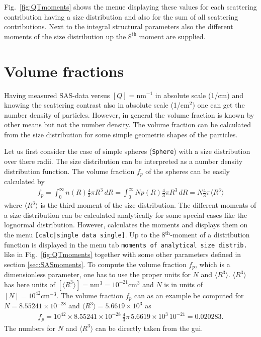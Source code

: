 Fig.\ \ref{fig:QTmoments} shows the \SASfit menue displaying these
values for each scattering contribution having a size distribution
and also for the sum of all scattering contributions. Next to the
integral structural parameters also the different moments of the
size distribution up the $8^\textrm{th}$ moment are supplied.

\section{Volume fractions}
\label{sec:volumefraction}

Having measured SAS-data versus $[Q]=\mathrm{nm}^{-1}$ in absolute scale
(1/cm) and knowing the scattering contrast also in absolute scale
(1/cm$^2$) one can get the number density of particles. However, in
general the volume fraction is known by other means but not the
number density. The volume fraction can be calculated from the size
distribution for some simple geometric shapes of the particles.


Let us first consider the case of simple spheres (\texttt{Sphere})
with a size distribution over there radii. The size distribution can
be interpreted as a number density distribution function. The volume
fraction $f_p$ of the spheres can be easily calculated by
\begin{align}
f_p = \int_0^\infty n(R) \frac{4}{3}\pi R^3 \, dR
    = \int_0^\infty N p(R) \frac{4}{3}\pi R^3 \, dR
    = N \frac{4}{3}\pi \langle R^3 \rangle
\label{eq:fpMomentSphere}
\end{align}
where $\langle R^3 \rangle$ is the third moment of the size
distribution. The different moments of a size distribution can be
calculated analytically for some special cases like the lognormal
distribution. However, \SASfit calculates the moments and displays
them on the menu \verb"[calc|single data single]". Up to the
8$^\textrm{th}$-moment of a distribution function is displayed in
the menu tab \texttt{moments of analytical size distrib.} like in
Fig.\ \ref{fig:QTmoments} together with some other parameters
defined in section \ref{sec:SASmoments}. To compute the volume
fraction $f_p$, which is a dimensionless parameter, one has to use
the proper units for $N$ and $\langle R^3 \rangle$. $\langle R^3
\rangle$ has here units of $\left[\langle R^3
\rangle\right]=\textrm{nm}^3=10^{-21}\textrm{cm}^3$ and $N$ is in
units of $\left[N\right]=10^{42}\textrm{cm}^{-3}$. The volume
fraction $f_p$ can as an example be computed for $N=8.55241\times
10^{-28}$ and $\langle R^3 \rangle=5.6619\times 10^{3}$ as
\begin{align}
f_p=10^{42}\times 8.55241\times 10^{-28} \, \frac{4}{3}\pi \, 5.6619\times 10^{3} \, 10^{-21}=0.020283.
\label{eq:fpMoments_eg}
\end{align}
The numbers for $N$ and $\langle R^3 \rangle$ can be directly taken from the \SASfit gui.

